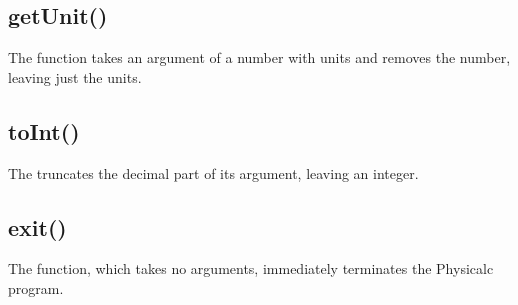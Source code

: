 \subsection{getUnit()}

The  function takes an argument of a number with
units and removes the number, leaving just the units.

\subsection{toInt()}

The  truncates the decimal part of its argument, leaving
an integer.

\subsection{exit()}

The  function, which takes no arguments, immediately
terminates the Physicalc program.
